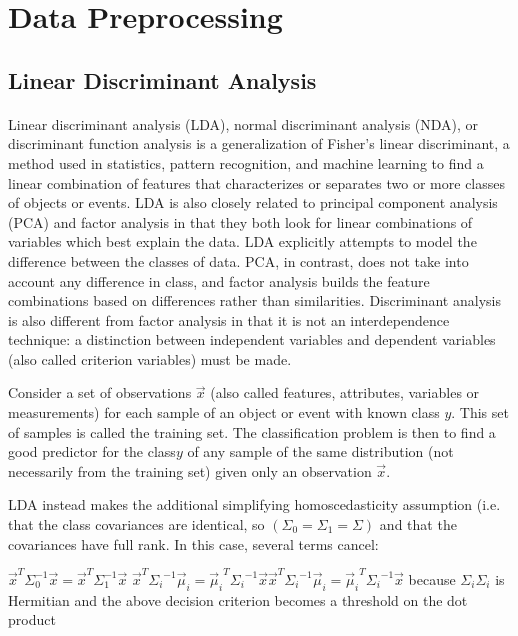\documentclass[12pt, a4paper]{report}
\begin{document}
\section{Data Preprocessing}
\subsection{Linear Discriminant Analysis}
\paragraph{} Linear discriminant analysis (LDA), normal discriminant analysis (NDA), or discriminant function analysis is a generalization of Fisher's linear discriminant, a method used in statistics, pattern recognition, and machine learning to find a linear combination of features that characterizes or separates two or more classes of objects or events.
LDA is also closely related to principal component analysis (PCA) and factor analysis in that they both look for linear combinations of variables which best explain the data. LDA explicitly attempts to model the difference between the classes of data. PCA, in contrast, does not take into account any difference in class, and factor analysis builds the feature combinations based on differences rather than similarities. Discriminant analysis is also different from factor analysis in that it is not an interdependence technique: a distinction between independent variables and dependent variables (also called criterion variables) must be made.

Consider a set of observations ${\vec {x}}$ (also called features, attributes, variables or measurements) for each sample of an object or event with known class $y$. This set of samples is called the training set. The classification problem is then to find a good predictor for the class$y$ of any sample of the same distribution (not necessarily from the training set) given only an observation ${\vec {x}}$.

LDA instead makes the additional simplifying homoscedasticity assumption (i.e. that the class covariances are identical, so  $(\Sigma _{0}=\Sigma _{1}=\Sigma )$ and that the covariances have full rank. In this case, several terms cancel:

${\vec {x}}^{T}\Sigma _{0}^{-1}{\vec {x}}={\vec {x}}^{T}\Sigma _{1}^{-1}{\vec {x}}$
${\displaystyle {\vec {x}}^{T}{\Sigma _{i}}^{-1}{\vec {\mu }}_{i}={{\vec {\mu }}_{i}}^{T}{\Sigma _{i}}^{-1}{\vec {x}}}{\displaystyle {\vec {x}}^{T}{\Sigma _{i}}^{-1}{\vec {\mu }}_{i}={{\vec {\mu }}_{i}}^{T}{\Sigma _{i}}^{-1}{\vec {x}}}$ because ${\displaystyle \Sigma _{i}}\Sigma _{i}$ is Hermitian
and the above decision criterion becomes a threshold on the dot product
\end{document}
